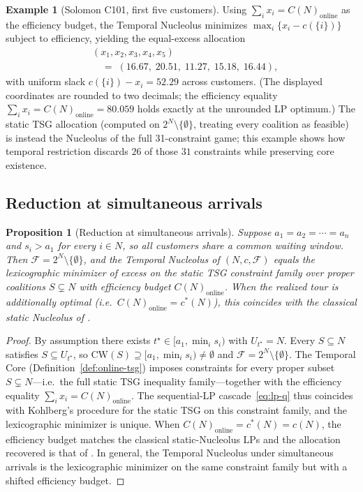 \documentclass[11pt]{article}
\newcommand{\F}{\mathcal{F}}
\newcommand{\CW}{\mathrm{CW}}
\newcommand{\cstar}{c^{\ast}}
\theoremstyle{plain}
\newtheorem{proposition}[theorem]{Proposition}
\theoremstyle{definition}
\newtheorem{example}[theorem]{Example}
\theoremstyle{remark}
\begin{document}
\begin{example}[Solomon C101, first five customers]
Using $\sum_i x_i = C(N)_{\text{online}}$ as the efficiency budget, the Temporal Nucleolus minimizes $\max_i\{x_i - c(\{i\})\}$ subject to efficiency, yielding the equal-excess allocation
\[
\begin{aligned}
& (x_1, x_2, x_3, x_4, x_5) \\
& \quad =\; (16.67,\; 20.51,\; 11.27,\; 15.18,\; 16.44),
\end{aligned}
\]
with uniform slack $c(\{i\})-x_i = 52.29$ across customers. (The displayed coordinates are rounded to two decimals; the efficiency equality $\sum_i x_i = C(N)_{\mathrm{online}}=80.059$ holds exactly at the unrounded LP optimum.) The static TSG allocation (computed on $2^N\setminus\{\emptyset\}$, treating every coalition as feasible) is instead the Nucleolus of the full 31-constraint game; this example shows how temporal restriction discards $26$ of those $31$ constraints while preserving core existence.
\end{example}

\subsection{Reduction at simultaneous arrivals}

\begin{proposition}[Reduction at simultaneous arrivals]
\label{prop:static-equiv}
Suppose $a_1 = a_2 = \cdots = a_n$ and $s_i > a_1$ for every $i\in N$, so all customers share a common waiting window. Then $\F = 2^N\setminus\{\emptyset\}$, and the Temporal Nucleolus of $(N,c,\F)$ equals the lexicographic minimizer of excess on the static TSG constraint family over proper coalitions $S\subsetneq N$ with efficiency budget $C(N)_{\text{online}}$. When the realized tour is additionally optimal (i.e.\ $C(N)_{\text{online}}=\cstar(N)$), this coincides with the classical static Nucleolus of \citet{potters1992tsg}.
\end{proposition}

\begin{proof}
By assumption there exists $t^{\star}\in[a_1,\min_i s_i)$ with $U_{t^{\star}} = N$. Every $S\subseteq N$ satisfies $S\subseteq U_{t^{\star}}$, so $\CW(S)\supseteq [a_1,\min_i s_i)\neq\emptyset$ and $\F = 2^N\setminus\{\emptyset\}$. The Temporal Core (Definition~\ref{def:online-tsg}) imposes constraints for every proper subset $S\subsetneq N$---i.e.\ the full static TSG inequality family---together with the efficiency equality $\sum_i x_i = C(N)_{\text{online}}$. The sequential-LP cascade~\eqref{eq:lp-q} thus coincides with Kohlberg's procedure for the static TSG on this constraint family, and the lexicographic minimizer is unique. When $C(N)_{\text{online}}=\cstar(N)=c(N)$, the efficiency budget matches the classical static-Nucleolus LPs and the allocation recovered is that of \citet{potters1992tsg}. In general, the Temporal Nucleolus under simultaneous arrivals is the lexicographic minimizer on the same constraint family but with a shifted efficiency budget.
\end{proof}
\end{document}

